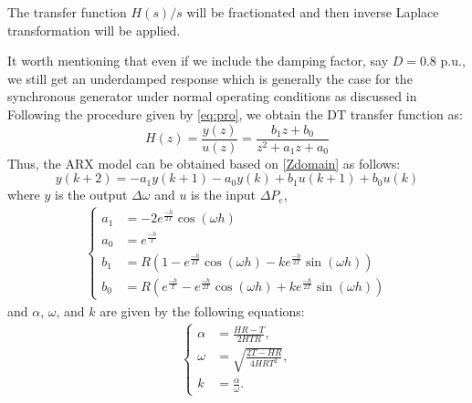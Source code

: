 \documentclass[10pt,journal,final]{IEEEtran}
\begin{document}
The transfer function $H(s)/s$ will be fractionated and then inverse Laplace transformation will be applied.

It worth mentioning that even if we include the damping factor, say $D=0.8$ p.u., we still get an {underdamped} response which is generally the case for the synchronous generator under normal operating conditions as discussed in \cite{bergen2000power} Following the procedure given by \eqref{eq:pro}, we obtain the DT transfer function as:
\begin{equation}\label{Zdomain}
H(z)=\frac{y(z)}{u(z)}=\frac{b_{1}z+b_{0}}{z^{2}+a_{1}z+a_{0}}
\end{equation}
Thus, the ARX model can be obtained based on \eqref{Zdomain} as follows:
\begin{equation}\label{ARX2}
y(k+2)=-a_{1}y(k+1)-a_{0}y(k)+b_{1}u(k+1)+b_{0}u(k)
\end{equation}
where $y$ is the output $\Delta \omega$ and $u$ is the input $\Delta P_{e}$,
\begin{align}
\begin{cases}
a_{1}&=-2e^{\frac{-h}{2T}}\cos{(\omega h)}\\
a_{0}&=e^{\frac{-h}{T}}\\
b_{1}&=R\left( 1- e^{\frac{-h}{2T}}\cos{(\omega h)} -ke^{\frac{-h}{2T}} \sin{(\omega h)} \right)\\
b_{0}&=R\left( e^{\frac{-h}{T}} - e^{\frac{-h}{2T}}\cos{(\omega h)} + ke^{\frac{-h}{2T}}\sin{(\omega h)} \right)
\end{cases}
\end{align}
and $\alpha$, $\omega$, and $k$ are given by the following equations:
\begin{align}
\begin{cases}
\alpha&=\frac{HR-T}{2HTR},\\
\omega&=\sqrt{\frac{2T-HR}{4HRT^{2}}},\\
k&=\frac{\alpha}{\omega}.
\end{cases}
\end{align}
\end{document}
